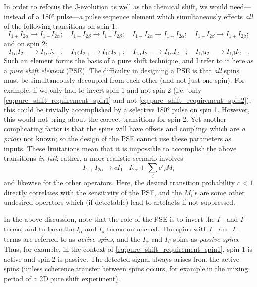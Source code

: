 In order to refocus the J-evolution as well as the chemical shift, we would need---instead of a \ang{180} pulse---a pulse sequence element which simultaneously effects \textit{all} of the following transitions on spin 1:
\begin{equation}
    \label{eq:pure_shift_requirement_spin1}
    I_{1+}I_{2\alpha} \longrightarrow I_{1-}I_{2\alpha}; \quad I_{1+}I_{2\beta} \longrightarrow I_{1-}I_{2\beta}; \quad
    I_{1-}I_{2\alpha} \longrightarrow I_{1+}I_{2\alpha}; \quad I_{1-}I_{2\beta} \longrightarrow I_{1+}I_{2\beta};
\end{equation}
and on spin 2:
\begin{equation}
    \label{eq:pure_shift_requirement_spin2}
    I_{1\alpha}I_{2+} \longrightarrow I_{1\alpha}I_{2-}; \quad I_{1\beta}I_{2+} \longrightarrow I_{1\beta}I_{2+}; \quad
    I_{1\alpha}I_{2-} \longrightarrow I_{1\alpha}I_{2+}; \quad I_{1\beta}I_{2-} \longrightarrow I_{1\beta}I_{2-}.
\end{equation}
Such an element forms the basis of a pure shift technique, and I refer to it here as a \textit{pure shift element} (PSE).
The difficulty in designing a PSE is that \textit{all} spins must be simultaneously decoupled from each other (and not just one spin).
For example, if we only had to invert spin 1 and not spin 2 (i.e.\ only \cref{eq:pure_shift_requirement_spin1} and not \cref{eq:pure_shift_requirement_spin2}), this could be trivially accomplished by a selective \ang{180} pulse on spin 1.
However, this would not bring about the correct transitions for spin 2.
Yet another complicating factor is that the spins will have offsets and couplings which are \textit{a priori} not known; so the design of the PSE cannot use these parameters as inputs.
These limitations mean that it is impossible to accomplish the above transitions \textit{in full}; rather, a more realistic scenario involves
\begin{equation}
    \label{eq:realistic_pse}
    I_{1+}I_{2\alpha} \longrightarrow c I_{1-}I_{2\alpha} + \sum_i c'_i M_i
\end{equation}
and likewise for the other operators.
Here, the desired transition probability $c < 1$ directly correlates with the sensitivity of the PSE, and the $M_i$'s are some other undesired operators which (if detectable) lead to artefacts if not suppressed.

In the above discussion, note that the role of the PSE is to invert the $I_+$ and $I_-$ terms, and to leave the $I_\alpha$ and $I_\beta$ terms untouched.
The spins with $I_+$ and $I_-$ terms are referred to as \textit{active spins}, and the $I_\alpha$ and $I_\beta$ spins as \textit{passive spins}.
Thus, for example, in the context of \cref{eq:pure_shift_requirement_spin1}, spin 1 is active and spin 2 is passive.
The detected signal always arises from the active spins (unless coherence transfer between spins occurs, for example in the mixing period of a 2D pure shift experiment).

